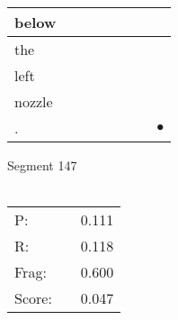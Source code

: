 \documentclass[landscape]{article}
\newcommand{\ssp}{\hspace{2pt}}
\newcommand{\mex}{\cellcolor{g}$\bullet$}
\begin{document}
\begin{tabular}{|l|p{10pt}|p{10pt}|p{10pt}|p{10pt}|p{10pt}|p{10pt}|p{10pt}|}
\hline
\ssp below \ssp&\hspace{2pt}&\hspace{2pt}&\hspace{2pt}&\hspace{2pt}&\hspace{2pt}&\hspace{2pt}&\hspace{2pt}\\
\hline
\ssp the \ssp&\hspace{2pt}&\hspace{2pt}&\hspace{2pt}&\hspace{2pt}&\hspace{2pt}&\hspace{2pt}&\hspace{2pt}\\
\hline
\ssp left \ssp&\hspace{2pt}&\hspace{2pt}&\hspace{2pt}&\hspace{2pt}&\hspace{2pt}&\hspace{2pt}&\hspace{2pt}\\
\hline
\ssp nozzle \ssp&\hspace{2pt}&\hspace{2pt}&\hspace{2pt}&\hspace{2pt}&\hspace{2pt}&\hspace{2pt}&\hspace{2pt}\\
\hline
\ssp \cellcolor{ref6}. \ssp&\hspace{2pt}&\hspace{2pt}&\hspace{2pt}&\hspace{2pt}&\hspace{2pt}&\hspace{2pt}&\hspace{2pt}\mex\\
\hline
\end{tabular}

\vspace{6pt}
\noindent Segment 147\\\\
\noindent\begin{tabular}{lm{12pt}r}
\hline
P:&&0.111\\
R:&&0.118\\
Frag:&&0.600\\
Score:&&0.047\\
\end{tabular}
\end{document}
